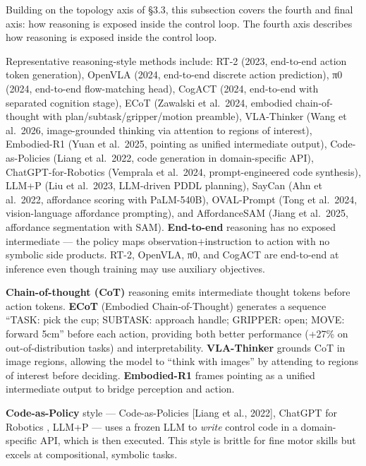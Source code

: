 \documentclass{article}
\begin{document}
Building on the topology axis of §3.3, this subsection covers the fourth and final axis: how reasoning is exposed inside the control loop. The fourth axis describes how reasoning is exposed inside the control loop.

Representative reasoning-style methods include: RT-2 (2023, end-to-end action token generation), OpenVLA (2024, end-to-end discrete action prediction), π0 (2024, end-to-end flow-matching head), CogACT (2024, end-to-end with separated cognition stage), ECoT (Zawalski et al.~2024, embodied chain-of-thought with plan/subtask/gripper/motion preamble), VLA-Thinker (Wang et al.~2026, image-grounded thinking via attention to regions of interest), Embodied-R1 (Yuan et al.~2025, pointing as unified intermediate output), Code-as-Policies (Liang et al.~2022, code generation in domain-specific API), ChatGPT-for-Robotics (Vemprala et al.~2024, prompt-engineered code synthesis), LLM+P (Liu et al.~2023, LLM-driven PDDL planning), SayCan (Ahn et al.~2022, affordance scoring with PaLM-540B), OVAL-Prompt (Tong et al.~2024, vision-language affordance prompting), and AffordanceSAM (Jiang et al.~2025, affordance segmentation with SAM). \textbf{End-to-end} reasoning has no exposed intermediate --- the policy maps observation+instruction to action with no symbolic side products. RT-2, OpenVLA, π0, and CogACT are end-to-end at inference even though training may use auxiliary objectives.

\textbf{Chain-of-thought (CoT)} reasoning emits intermediate thought tokens before action tokens. \textbf{ECoT} (Embodied Chain-of-Thought) \cite{zawalski2024roboticcontrolviae} generates a sequence ``TASK: pick the cup; SUBTASK: approach handle; GRIPPER: open; MOVE: forward 5cm'' before each action, providing both better performance (+27\% on out-of-distribution tasks) and interpretability. \textbf{VLA-Thinker} \cite{wang2026vlathinkerboosting} grounds CoT in image regions, allowing the model to ``think with images'' by attending to regions of interest before deciding. \textbf{Embodied-R1} \cite{yuan2025embodiedr1reinforc} frames pointing as a unified intermediate output to bridge perception and action.

\textbf{Code-as-Policy} style --- Code-as-Policies {[}Liang et al., 2022{]}, ChatGPT for Robotics \cite{vemprala2024chatgptforrobotics}, LLM+P \cite{liu2023llmpempoweringlarg} --- uses a frozen LLM to \emph{write} control code in a domain-specific API, which is then executed. This style is brittle for fine motor skills but excels at compositional, symbolic tasks.
\end{document}
